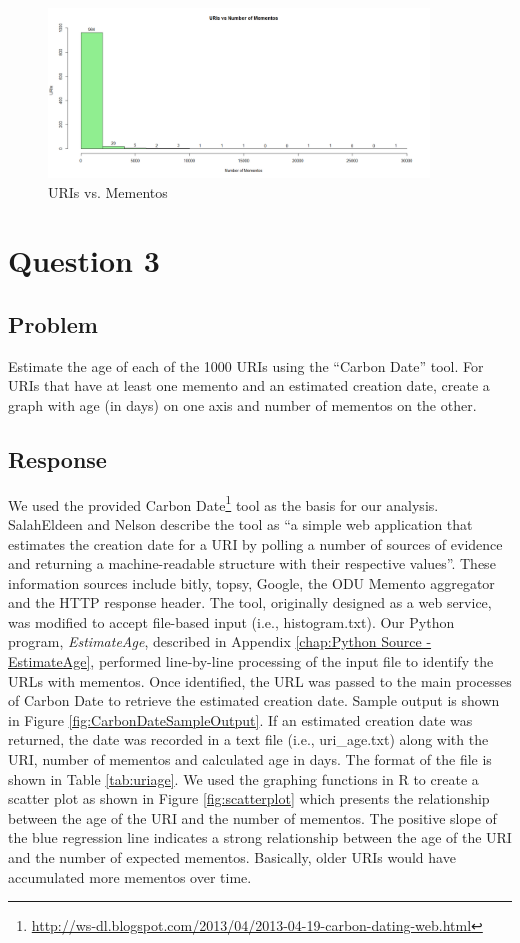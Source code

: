 \documentclass[letterpaper,11pt]{report}
\begin{document}
\begin{savenotes}
\begin{figure}[htbp]
	\centering
		\includegraphics[width=0.90\textwidth]{mementoHistogram.png}
	\caption{URIs vs. Mementos}
	\label{fig:mementoHistogram}
\end{figure}


\section{Question 3}
\subsection{Problem}Estimate the age of each of the 1000 URIs using the ``Carbon Date'' tool. For URIs that have at least one memento and an estimated creation date, create a graph with age (in days) on one axis and number of mementos on the other.
\subsection{Response}We used the provided Carbon Date\footnote{\url{http://ws-dl.blogspot.com/2013/04/2013-04-19-carbon-dating-web.html}} tool as the basis for our analysis.  SalahEldeen and Nelson \cite{salaheldeen2013carbon} describe the tool as ``a simple web application that estimates the creation date for a URI by polling a number
of sources of evidence and returning a machine-readable structure with their respective values''.  These information sources include bitly, topsy, Google, the ODU Memento aggregator and the HTTP response header. The tool, originally designed as a web service, was modified to accept file-based input (i.e., histogram.txt). Our Python program, \emph{EstimateAge}, described in Appendix \ref{chap:Python Source - EstimateAge}, performed line-by-line processing of the input file to identify the URLs with mementos. Once identified, the URL was passed to the main processes of Carbon Date to retrieve the estimated creation date.  Sample output is shown in Figure \ref{fig:CarbonDateSampleOutput}. If an estimated creation date was returned, the date was recorded in a text file (i.e., uri\_age.txt) along with the URI, number of mementos and calculated age in days. The format of the file is shown in Table \ref{tab:uriage}. We used the graphing functions in R to create a scatter plot as shown in Figure \ref{fig:scatterplot} which presents the relationship between the age of the URI and the number of mementos. The positive slope of the blue regression line indicates a strong relationship between the age of the URI and the number of expected mementos. Basically, older URIs would have accumulated more mementos over time.


\end{savenotes}
\end{document}
